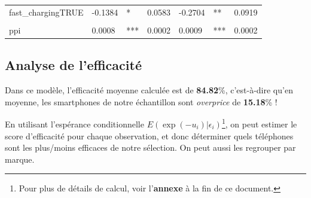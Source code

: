 \documentclass[
  12pt,
]{report}
\begin{document}
\begin{table}[!h]
\begin{tabular}[t]{lllllll}
fast\_chargingTRUE & -0.1384 & * & 0.0583 & -0.2704 & ** & 0.0919\\
\cellcolor{gray!6}{network5G} & \cellcolor{gray!6}{0.3058} & \cellcolor{gray!6}{***} & \cellcolor{gray!6}{0.0365} & \cellcolor{gray!6}{0.305} & \cellcolor{gray!6}{***} & \cellcolor{gray!6}{0.0353}\\
ppi & 0.0008 & *** & 0.0002 & 0.0009 & *** & 0.0002\\
\bottomrule
\end{tabular}
\end{table}

\newpage

\subsection{Analyse de l'efficacité}\label{analyse-de-lefficacituxe9}

Dans ce modèle, l'efficacité moyenne calculée est de \textbf{84.82}\%,
c'est-à-dire qu'en moyenne, les smartphones de notre échantillon sont
\emph{overprice} de \textbf{15.18}\% !

En utilisant l'espérance conditionnelle
\(E(\exp(-u_i) | \epsilon_i)\)\footnote{Pour plus de détails de calcul,
  voir l'\textbf{annexe} à la fin de ce document.}, on peut estimer le
score d'efficacité pour chaque observation, et donc déterminer quels
téléphones sont les plus/moins efficaces de notre sélection. On peut
aussi les regrouper par marque.
\end{document}
